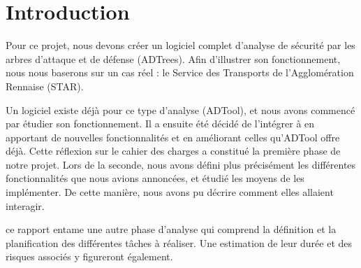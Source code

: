 \section{Introduction}
	\label{sec:intro}





	Pour ce projet, nous devons créer un logiciel complet d'analyse de sécurité par les arbres d'attaque et de défense (ADTrees). Afin d'illustrer son fonctionnement, nous nous baserons sur un cas réel : le Service des Transports de l'Agglomération Rennaise (STAR).

	Un logiciel existe déjà pour ce type d'analyse (ADTool), et nous avons commencé par étudier son fonctionnement. Il a ensuite été décidé de l'intégrer à \glasir{} en apportant de nouvelles fonctionnalités et en améliorant celles qu'ADTool offre déjà. Cette réflexion sur le cahier des charges a constitué la première phase de notre projet. Lors de la seconde, nous avons défini plus précisément les différentes fonctionnalités que nous avions annoncées, et étudié les moyens de les implémenter. De cette manière, nous avons pu décrire comment elles allaient interagir.

	ce rapport entame une autre phase d'analyse qui comprend la définition et la planification des différentes tâches à réaliser. Une estimation de leur durée et des risques associés y figureront également.